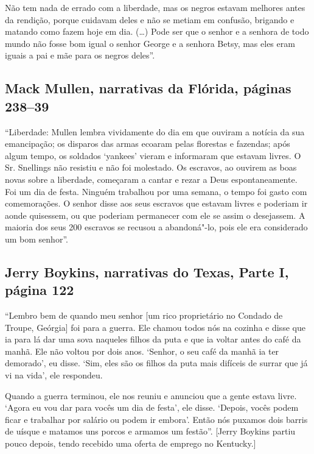 Não tem nada de errado com a liberdade, mas os negros estavam melhores
antes da rendição, porque cuidavam deles e não se metiam em confusão,
brigando e matando como fazem hoje em dia. (\ldots{}) Pode ser que o
senhor e a senhora de todo mundo não fosse bom igual o senhor George e a
senhora Betsy, mas eles eram iguais a pai e mãe para os negros deles''.

\subsection{Mack Mullen, narrativas da Flórida, páginas 238--39}
\label{ref204}

``Liberdade: Mullen lembra vividamente do dia em que ouviram a notícia
da sua emancipação; os disparos das armas ecoaram pelas florestas e
fazendas; após algum tempo, os soldados `yankees' vieram e informaram
que estavam livres. O Sr. Snellings não resistiu e não foi molestado. Os
escravos, ao ouvirem as boas novas sobre a liberdade, começaram a cantar
e rezar a Deus espontaneamente. Foi um dia de festa. Ninguém trabalhou
por uma semana, o tempo foi gasto com comemorações. O senhor disse aos
seus escravos que estavam livres e poderiam ir aonde quisessem, ou que
poderiam permanecer com ele se assim o desejassem. A maioria dos seus
200 escravos se recusou a abandoná"-lo, pois ele era considerado um bom
senhor''.

\subsection{Jerry Boykins, narrativas do Texas, Parte I, página 122} \label{ref30}

``Lembro bem de quando meu senhor {[}um rico proprietário no Condado de
Troupe, Geórgia{]} foi para a guerra. Ele chamou todos nós na cozinha e
disse que ia para lá dar uma sova naqueles filhos da puta e que ia
voltar antes do café da manhã. Ele não voltou por dois anos. `Senhor, o
seu café da manhã ia ter demorado', eu disse. `Sim, eles são os filhos
da puta mais difíceis de surrar que já vi na vida', ele respondeu.

Quando a guerra terminou, ele nos reuniu e anunciou que a gente estava
livre. `Agora eu vou dar para vocês um dia de festa', ele disse.
`Depois, vocês podem ficar e trabalhar por salário ou podem ir embora'.
Então nós puxamos dois barris de uísque e matamos uns porcos e armamos
um festão''. {[}Jerry Boykins partiu pouco depois, tendo recebido uma
oferta de emprego no Kentucky.{]}

